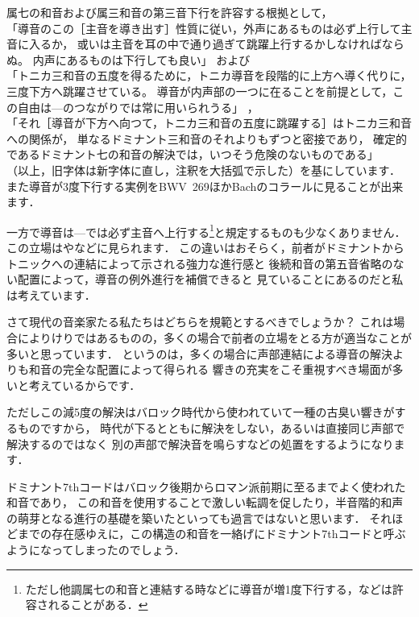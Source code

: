 \documentclass[dvipdfmx,uplatex,b5paper,openany,jbase=12Q,nomag*,textwidth-limit=44%
               ]{gachimuchi}
\begin{document}
\begin{NB}
  属七の和音および属三和音の第三音下行を許容する根拠として，\\
  「導音のこの［主音を導き出す］性質に従い，外声にあるものは必ず上行して主音に入るか，
  或いは主音を耳の中で通り過ぎて跳躍上行するかしなければならぬ。
  内声にあるものは下行しても良い」
  \cite[p.~23]{chHASEGAWA1}および\\
  「トニカ三和音の五度を得るために，トニカ導音を段階的に上方へ導く代りに，三度下方へ跳躍させている。
  導音が内声部の一つに在ることを前提として，この自由は\Gnv---\Gni のつながりでは常に用いられうる」
  \cite[p.~33]{chTHUILLE1}，\\
  「それ［導音が下方へ向つて，トニカ三和音の五度に跳躍する］はトニカ三和音への関係が，
  単なるドミナント三和音のそれよりもずつと密接であり，
  確定的であるドミナント七の和音の解決では，いつそう危険のないものである」
  \cite[p.~74]{chTHUILLE1}\\
  （以上，旧字体は新字体に直し，注釈を大括弧で示した）を基にしています．
  また導音が3度下行する実例をBWV~269ほかBachのコラールに見ることが出来ます．
  
  一方で導音は\Gnv---\Gni では必ず主音へ上行する\footnote{
    ただし他調属七の和音と連結する時などに導音が増1度下行する，などは許容されることがある．
  }と規定するものも少なくありません．
  この立場はやなどに見られます．
  この違いはおそらく，前者がドミナントからトニックへの連結によって示される強力な進行感と
  後続和音の第五音省略のない配置によって，導音の例外進行を補償できると
  見ていることにあるのだと私は考えています．
  
  さて現代の音楽家たる私たちはどちらを規範とするべきでしょうか？\<\zwspace
  これは場合によりけりではあるものの，多くの場合で前者の立場をとる方が適当なことが多いと思っています．
  というのは，多くの場合に声部連結による導音の解決よりも和音の完全な配置によって得られる
  響きの充実をこそ重視すべき場面が多いと考えているからです．
\end{NB}

ただしこの減5度の解決はバロック時代から使われていて一種の古臭い響きがするものですから，
時代が下るとともに解決をしない，あるいは直接同じ声部で解決するのではなく
別の声部で解決音を鳴らすなどの処置をするようになります．

\begin{Yodan}
ドミナント7thコードはバロック後期からロマン派前期に至るまでよく使われた和音であり，
この和音を使用することで激しい転調を促したり，半音階的和声の萌芽となる進行の基礎を築いたといっても過言ではないと思います．
それほどまでの存在感ゆえに，この構造の和音を一絡げにドミナント7thコードと呼ぶようになってしまったのでしょう．


\end{Yodan}
\end{document}
